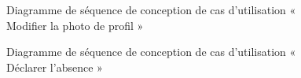 \begin{figure}[H]
  \centering
  \caption{Diagramme de séquence de conception de cas d'utilisation «  Modifier la photo de profil »}
  \label{fig:conception_sequence_edit_profil_avatar}
\end{figure}

\begin{figure}[H]
  \centering
  \caption{Diagramme de séquence de conception de cas d'utilisation «  Déclarer l'absence »}
  \label{fig:conception_sequence_declare_absence}
\end{figure}

